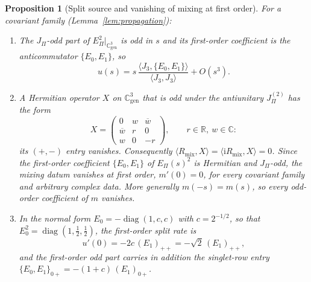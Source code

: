\documentclass[11pt]{article}
\newtheorem{proposition}{Proposition}
\theoremstyle{definition}
\theoremstyle{remark}
\newcommand{\JPi}{J_{\Pi}}
\newcommand{\Jthree}{J_{3}}
\newcommand{\Rmix}{R_{\mathrm{mix}}}
\newcommand{\Cgen}{\mathbb{C}^{3}_{\mathrm{gen}}}
\newcommand{\Epi}{E_{\Pi}}
\newcommand{\diag}{\operatorname{diag}}
\begin{document}
    \begin{proposition}[Split source and vanishing of mixing at first order]
      \label{prop:source}
      For a covariant family (Lemma~\ref{lem:propagation}):
      \begin{enumerate}
        \item[(i)] The $\JPi$-odd part of $\Epi^2|_{\Cgen}$ is odd in $s$ and its first-order coefficient is the
          anticommutator $\{E_0, E_1\}$, so
          \begin{equation}
            \label{eq:source}
            u(s) = s\,\frac{\langle \Jthree, \{E_0, E_1\}\rangle}{\langle \Jthree, \Jthree\rangle} + O(s^3).
          \end{equation}
        \item[(ii)] A Hermitian operator $X$ on $\Cgen$ that is odd under the antiunitary $\JPi^{(2)}$ has the form
          \begin{equation}
            \label{eq:oddform}
            X = \begin{pmatrix} 0 & w & \overline{w} \\ \overline{w} & r & 0 \\ w & 0 & -r \end{pmatrix},
            \qquad r \in \mathbb{R},\ w \in \mathbb{C}:
          \end{equation}
          its $(+,-)$ entry vanishes.
          Consequently $\langle \Rmix, X\rangle = \langle \mathrm{i}\Rmix, X\rangle = 0$.
          Since the first-order coefficient $\{E_0, E_1\}$ of $\Epi(s)^2$ is Hermitian and $\JPi$-odd, the mixing
          datum vanishes at first order, $m'(0) = 0$, for every covariant family and arbitrary complex data.
          More generally $m(-s) = m(s)$, so every odd-order coefficient of $m$ vanishes.
        \item[(iii)] In the normal form $E_0 = -\diag(1, c, c)$ with $c = 2^{-1/2}$, so that $E_0^2 = \diag(1, \tfrac12,
          \tfrac12)$, the first-order split rate is
          \begin{equation}
            \label{eq:criterion}
            u'(0) = -2c\,(E_1)_{++} = -\sqrt{2}\,(E_1)_{++},
          \end{equation}
          and the first-order odd part carries in addition the singlet-row entry
          $\{E_0, E_1\}_{0+} = -(1+c)\,(E_1)_{0+}$.
      \end{enumerate}
    \end{proposition}
\end{document}
